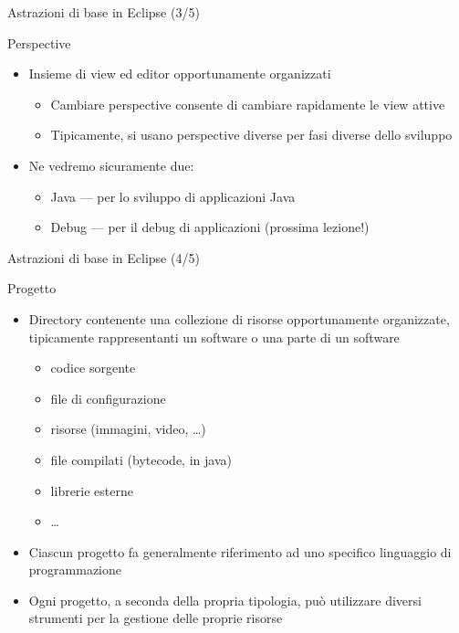 \documentclass[presentation]{beamer}
\begin{document}
\begin{frame}{Astrazioni di base in Eclipse (3/5)}
\begin{block}{Perspective}
\begin{itemize}
\item Insieme di view ed editor opportunamente organizzati
\begin{itemize}
\item Cambiare perspective consente di cambiare rapidamente le view attive
\item Tipicamente, si usano perspective diverse per fasi diverse dello sviluppo
\end{itemize}
\item Ne vedremo sicuramente due:
\begin{itemize}
\item Java --- per lo sviluppo di applicazioni Java
\item Debug --- per il debug di applicazioni (prossima lezione!)
\end{itemize}
\end{itemize}
\end{block}
\end{frame}

\begin{frame}{Astrazioni di base in Eclipse (4/5)}
\begin{block}{Progetto}
\begin{itemize}
\item Directory contenente una collezione di risorse opportunamente organizzate, tipicamente rappresentanti un software o una parte di un software
\begin{itemize}
\item codice sorgente
\item file di configurazione
\item risorse (immagini, video, \dots)
\item file compilati (bytecode, in java)
\item librerie esterne
\item \dots
\end{itemize}
\item Ciascun progetto fa generalmente riferimento ad uno specifico linguaggio di programmazione
\item Ogni progetto, a seconda della propria tipologia, può utilizzare diversi strumenti per la gestione delle proprie risorse
\end{itemize}
\end{block}
\end{frame}
\end{document}
